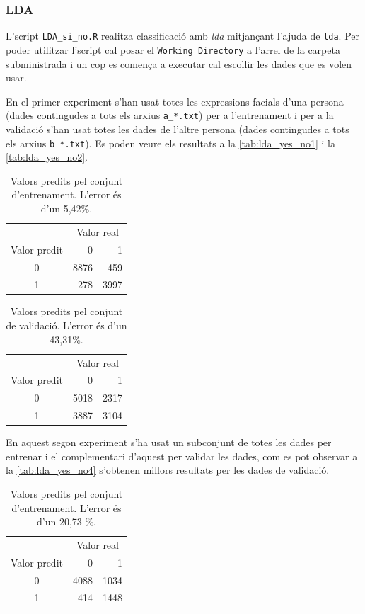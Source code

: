 \documentclass[a4paper]{article}
\begin{document}
\subsubsection{LDA}
L'script \verb|LDA_si_no.R| realitza classificació amb \emph{lda} mitjançant l'ajuda de \verb|lda|. Per poder utilitzar l'script cal posar el \verb|Working Directory| a l'arrel de la carpeta subministrada i un cop es comença a executar cal escollir les dades que es volen usar. 
 
En el primer experiment s'han usat totes les expressions facials d'una persona (dades contingudes a tots els arxius \verb|a_*.txt|) per a l'entrenament i per a la validació s'han usat totes les dades de l'altre persona (dades contingudes a tots els arxius \verb|b_*.txt|). Es poden veure els resultats a la \autoref{tab:lda_yes_no1} i la 	\autoref{tab:lda_yes_no2}.

\begin{table}[H]
	\centering
	\def\arraystretch{1.5}
	\begin{tabular}{c|rr}
		& \multicolumn{2}{c}{Valor real} \\
		Valor predit & 0 & 1 \\
		\hline
		0 & 8876 & 459 \\
		1 & 278 & 3997 \\
	\end{tabular}
	\caption{Valors predits pel conjunt d'entrenament. L'error és d'un 5,42\%.}
	\label{tab:lda_yes_no1}
\end{table}

\begin{table}[H]
	\centering
	\def\arraystretch{1.5}
	\begin{tabular}{c|rr}
		& \multicolumn{2}{c}{Valor real} \\
		Valor predit & 0 & 1 \\
		\hline
		0 & 5018 & 2317 \\
		1 & 3887 & 3104 \\
	\end{tabular}
	\caption{Valors predits pel conjunt de validació. L'error és d'un 43,31\%.}
	\label{tab:lda_yes_no2}
\end{table}

En aquest segon experiment s'ha usat un subconjunt de totes les dades per entrenar i el complementari d'aquest per validar les dades, com es pot observar a la \autoref{tab:lda_yes_no4} s'obtenen millors resultats per les dades de validació.

\begin{table}[H]
	\centering
	\def\arraystretch{1.5}
	\begin{tabular}{c|rr}
		& \multicolumn{2}{c}{Valor real} \\
		Valor predit & 0 & 1 \\
		\hline
		0 & 4088 & 1034 \\
		1 &  414 & 1448 \\
	\end{tabular}
	\caption{Valors predits pel conjunt d'entrenament. L'error és d'un 20,73 \%.}
	\label{tab:lda_yes_no3}
\end{table}
\end{document}
